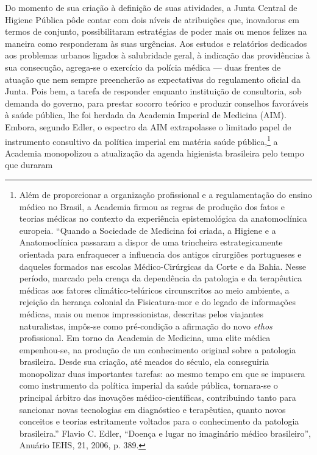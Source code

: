 Do momento de sua criação à definição de suas atividades, a Junta
Central de Higiene Pública pôde contar com dois níveis de atribuições
que, inovadoras em termos de conjunto, possibilitaram estratégias de
poder mais ou menos felizes na maneira como responderam às suas
urgências. Aos estudos e relatórios dedicados aos problemas urbanos
ligados à salubridade geral, à indicação das providências à sua
consecução, agrega-se o exercício da polícia médica --- duas frentes de
atuação que nem sempre preencherão as expectativas do regulamento
oficial da Junta. Pois bem, a tarefa de responder enquanto instituição
de consultoria, sob demanda do governo, para prestar socorro teórico e
produzir conselhos favoráveis à saúde pública, lhe foi herdada da
Academia Imperial de Medicina (AIM). Embora, segundo Edler, o espectro
da AIM extrapolasse o limitado papel de instrumento consultivo da
política imperial em matéria saúde pública,\footnote{Além de
  proporcionar a organização profissional e a regulamentação do ensino
  médico no Brasil, a Academia firmou as regras de produção dos fatos e
  teorias médicas no contexto da experiência epistemológica da
  anatomoclínica europeia. ``Quando a Sociedade de Medicina foi criada,
  a Higiene e a Anatomoclínica passaram a dispor de uma trincheira
  estrategicamente orientada para enfraquecer a influencia dos antigos
  cirurgiões portugueses e daqueles formados nas escolas
  Médico-Cirúrgicas da Corte e da Bahia. Nesse período, marcado pela
  crença da dependência da patologia e da terapêutica médicas aos
  fatores climático-telúricos circunscritos ao meio ambiente, a rejeição
  da herança colonial da Fisicatura-mor e do legado de informações
  médicas, mais ou menos impressionistas, descritas pelos viajantes
  naturalistas, impôs-se como pré-condição a afirmação do novo
  \textit{ethos} profissional. Em torno da Academia de Medicina, uma elite
  médica empenhou-se, na produção de um conhecimento original sobre a
  patologia brasileira. Desde sua criação, até meados do século, ela
  conseguiria monopolizar duas importantes tarefas: ao mesmo tempo em
  que se impusera como instrumento da política imperial da saúde
  pública, tornara-se o principal árbitro das inovações
  médico-científicas, contribuindo tanto para sancionar novas
  tecnologias em diagnóstico e terapêutica, quanto novos conceitos e
  teorias estritamente voltados para o conhecimento da patologia
  brasileira.'' Flavio C. Edler, ``Doença e lugar no imaginário médico
  brasileiro'', Anuário IEHS, 21, 2006, p. 389.} a Academia monopolizou
a atualização da agenda higienista brasileira pelo tempo que duraram
